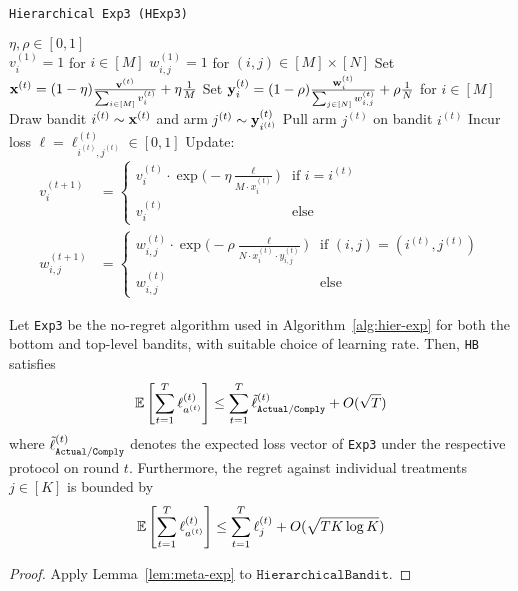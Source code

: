 \begin{algorithm}[tb]
   \caption{\texttt{Hierarchical Exp3 (HExp3)}}
   \label{alg:meta-exp2}
   \begin{algorithmic}   
       $\eta,\rho\in[0,1]$\\
      \STATE $v^{(1)}_{i}=1$ for $i\in[M]$
   	\STATE $w^{(1)}_{i,j}=1$ for $(i,j)\in[M]\times[N]$
	   \STATE Set ${\mathbf x}^{(t)} = (1-\eta) \frac{{\mathbf v}^{(t)}}{\sum_{i\in[M]} v^{(t)}_{i}} + \eta\frac{1}{M}$
	   \STATE Set ${\mathbf y}^{(t)}_{i} = (1-\rho)\frac{{\mathbf w}^{(t)}_{i}}{\sum_{j\in[N]} w^{(t)}_{i,j}} + \rho\frac{1}{N}$ for $i\in[M]$
	\STATE Draw bandit $i^{(t)}\sim {\mathbf x}^{(t)}$ and arm $j^{(t)}\sim {\mathbf y}^{(t)}_{i^{(t)}}$
	\STATE Pull arm $j^{(t)}$ on bandit $i^{(t)}$
	   \STATE Incur loss $\ell =\ell_{i^{(t)}, j^{(t)}}^{(t)}\in [0,1]$ 
	\STATE Update:
	\begin{align}
		v^{(t+1)}_i & = \begin{cases}
			v^{(t)}_{i}\cdot 
			\exp\big(-\eta \frac{\ell}{M\cdot x_{i}^{(t)}}\big) & \text{if } i=i^{(t)} \\
			v^{(t)}_{i} & \text{else}
		\end{cases}		 
		\\
		w^{(t+1)}_{i,j} & = \begin{cases}
			w^{(t)}_{i,j}\cdot \exp\big(-\rho\frac{\ell}{N\cdot x_i^{(t)}\cdot y_{i,j}^{(t)}}\big) 
			& \text{if }(i,j)=(i^{(t)}, j^{(t)}) \\
			w^{(t)}_{i,j} &\text{else}
		\end{cases}
	\end{align}
   	\ENDFOR
   	\end{algorithmic}
\end{algorithm}


\begin{thm}\label{thm:cexp}\eod
	Let \texttt{Exp3} be the no-regret algorithm used in Algorithm~\ref{alg:hier-exp} for both the bottom and top-level bandits, with suitable choice of learning rate. Then, \texttt{HB} satisfies
	\begin{equation}
		\operatorname*{\mathbb E}\left[\sum_{t=1}^T\ell^{(t)}_{a^{(t)}}\right]
		\leq \sum_{t=1}^T \tilde{\ell}^{(t)}_{{\texttt{Actual}}/{\texttt{Comply}}}
		+ O(\sqrt{T})
	\end{equation}
	where $\tilde{\ell}^{(t)}_{{\texttt{Actual}}/{\texttt{Comply}}}$ denotes the expected loss vector of \texttt{Exp3} under the respective protocol on round $t$. 
	Furthermore, the regret against individual treatments $j\in[K]$ is bounded by
	\begin{equation}
		\operatorname*{\mathbb E}\left[\sum_{t=1}^{T} \ell^{(t)}_{a^{(t)}}\right]
		\leq \sum_{t=1}^T\ell^{(t)}_{j}
		+ O(\sqrt{T K\log K})
	\end{equation}
\end{thm}

\begin{proof}
	Apply Lemma~\ref{lem:meta-exp} to $\texttt{HierarchicalBandit}$.
\end{proof}



